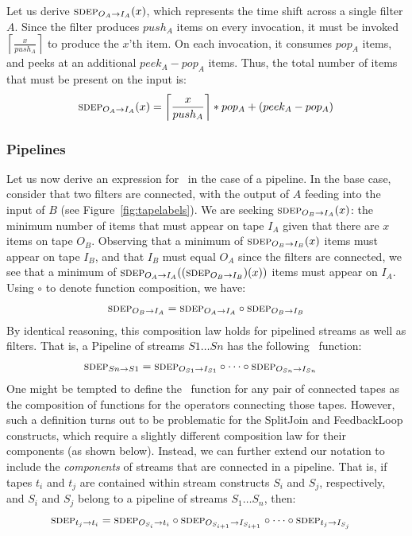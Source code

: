 Let us derive $\mi{I_A}{O_A}(x)$, which represents the time shift
across a single filter $A$.  Since the filter produces $push_A$ items
on every invocation, it must be invoked
$\left\lceil\frac{x}{push_A}\right\rceil$ to produce the $x$'th item.
On each invocation, it consumes $pop_A$ items, and peeks at an
additional $peek_A-pop_A$ items.  Thus, the total number of items that
must be present on the input is:
\begin{align}
\label{eq:minfilter}
\mi{I_A}{O_A}(x) = \left\lceil\frac{x}{push_A}\right\rceil*pop_A+(peek_A-pop_A)
\end{align}

\subsubsection{Pipelines}
\label{sec:timepipe}

Let us now derive an expression for \sdep~in the case of a pipeline.
In the base case, consider that two filters are connected, with the
output of $A$ feeding into the input of $B$ (see
Figure~\ref{fig:tapelabels}).  We are seeking $\mi{I_A}{O_B}(x)$: the
minimum number of items that must appear on tape $I_A$ given that
there are $x$ items on tape $O_B$.  Observing that a minimum of
$\mi{I_B}{O_B}(x)$ items must appear on tape $I_B$, and that $I_B$
must equal $O_A$ since the filters are connected, we see that a
minimum of $\mi{I_A}{O_A}((\mi{I_B}{O_B})(x))$ items must appear
on $I_A$.  Using $\circ$ to denote function composition, we have:
\begin{align*}
\mi{I_A}{O_B} = \mi{I_A}{O_A} \circ \mi{I_B}{O_B}
\end{align*}
By identical reasoning, this composition law holds for pipelined
streams as well as filters.  That is, a Pipeline of streams $S1 \dots
Sn$ has the following \sdep~function:
\begin{align}
\label{eq:composepipe}
\mi{S1}{Sn} &= \mi{I_{S1}}{O_{S1}} \circ \dots \circ \mi{I_{Sn}}{O_{Sn}}
\end{align}
One might be tempted to define the \sdep~function for any pair of
connected tapes as the composition of functions for the operators
connecting those tapes.  However, such a definition turns out to be
problematic for the SplitJoin and FeedbackLoop constructs, which
require a slightly different composition law for their components (as
shown below).  Instead, we can further extend our notation to include
the {\it components} of streams that are connected in a pipeline.
That is, if tapes $t_i$ and $t_j$ are contained within stream
constructs $S_i$ and $S_j$, respectively, and $S_i$ and $S_j$ belong
to a pipeline of streams $S_1 \dots S_n$, then:
\begin{align}
\label{eq:composetape}
\mi{t_i}{t_j} &= \mi{t_i}{O_{S_i}} \circ \mi{I_{S_{i+1}}}{O_{S_{i+1}}}
\circ \dots \circ \mi{I_{S_j}}{t_j}
\end{align}

